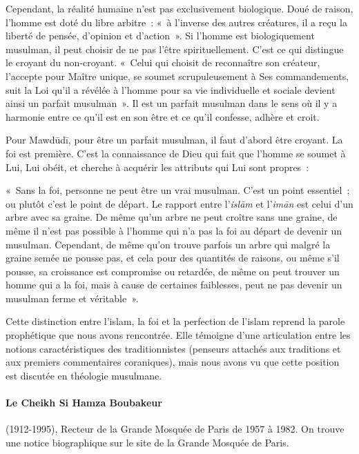 Cependant, la réalité humaine n'est pas exclusivement biologique. Doué
de raison, l'homme est doté du libre arbitre~: «~à l'inverse des autres
créatures, il a reçu la liberté de pensée, d'opinion et
d'action~». Si l'homme est biologiquement
musulman, il peut choisir de ne pas l'être spirituellement. C'est ce qui
distingue le croyant du non-croyant. «~Celui qui choisit de reconnaître
son créateur, l'accepte pour Maître unique, se soumet scrupuleusement à
Ses commandements, suit la Loi qu'il a révélée à l'homme pour sa vie
individuelle et sociale devient ainsi un parfait musulman~». Il est un parfait musulman dans le sens où il y a harmonie
entre ce qu'il est en son être et ce qu'il confesse, adhère et croit.

Pour Mawdūdī, pour être un parfait musulman, il faut d'abord être
croyant. La foi est première. C'est la connaissance de Dieu qui fait que
l'homme se soumet à Lui, Lui obéit, et cherche à acquérir les attributs
qui Lui sont propres~:

«~Sans la foi, personne ne peut être un vrai musulman. C'est un point
essentiel~; ou plutôt c'est le point de départ. Le rapport entre
l'\emph{islām} et l'\emph{imān} est celui d'un arbre avec sa graine. De
même qu'un arbre ne peut croître sans une graine, de même il n'est pas
possible à l'homme qui n'a pas la foi au départ de devenir un musulman.
Cependant, de même qu'on trouve parfois un arbre qui malgré la graine
semée ne pousse pas, et cela pour des quantités de raisons, ou même s'il
pousse, sa croissance est compromise ou retardée, de même on peut
trouver un homme qui a la foi, mais à cause de certaines faiblesses,
peut ne pas devenir un musulman ferme et véritable~».

Cette distinction entre l'islam, la foi et la perfection de l'islam
reprend la parole prophétique que nous avons rencontrée. Elle témoigne
d'une articulation entre les notions caractéristiques des
traditionnistes (penseurs attachés aux traditions et aux premiers
commentaires coraniques), mais nous avons vu que cette position est
discutée en théologie musulmane.


\paragraph{Le Cheikh Si Hamza Boubakeur}
(1912-1995), Recteur de la Grande Mosquée de Paris de 1957 à 1982. On trouve une notice biographique sur le site de la Grande Mosquée de
Paris.

